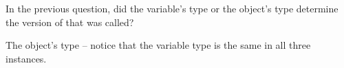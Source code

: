 \Q In the previous question, did the variable's type or the object's type determine the version of  that was called?

\begin{answer}
The object's type -- notice that the variable type is the same in all three instances.
\end{answer}


%
